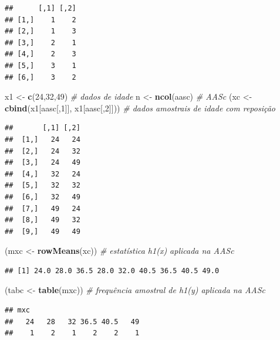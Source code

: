 \documentclass[
]{book}
\newenvironment{Shaded}{\begin{snugshade}}{\end{snugshade}}
\newcommand{\CommentTok}[1]{\textcolor[rgb]{0.56,0.35,0.01}{\textit{#1}}}
\newcommand{\DecValTok}[1]{\textcolor[rgb]{0.00,0.00,0.81}{#1}}
\newcommand{\KeywordTok}[1]{\textcolor[rgb]{0.13,0.29,0.53}{\textbf{#1}}}
\newcommand{\NormalTok}[1]{#1}
\newcommand{\StringTok}[1]{\textcolor[rgb]{0.31,0.60,0.02}{#1}}
\theoremstyle{definition}
\theoremstyle{definition}
\theoremstyle{definition}
\theoremstyle{remark}
\begin{document}
\begin{verbatim}
##      [,1] [,2]
## [1,]    1    2
## [2,]    1    3
## [3,]    2    1
## [4,]    2    3
## [5,]    3    1
## [6,]    3    2
\end{verbatim}

\begin{Shaded}
\begin{Highlighting}[]
\NormalTok{x1 \textless{}{-}}\StringTok{ }\KeywordTok{c}\NormalTok{(}\DecValTok{24}\NormalTok{,}\DecValTok{32}\NormalTok{,}\DecValTok{49}\NormalTok{)           }\CommentTok{\# dados de idade}
\NormalTok{n \textless{}{-}}\StringTok{ }\KeywordTok{ncol}\NormalTok{(aasc)}
\CommentTok{\# AASc}
\NormalTok{(xc \textless{}{-}}\StringTok{ }\KeywordTok{cbind}\NormalTok{(x1[aasc[,}\DecValTok{1}\NormalTok{]], x1[aasc[,}\DecValTok{2}\NormalTok{]])) }\CommentTok{\# dados amostrais de idade com reposição}
\end{Highlighting}
\end{Shaded}

\begin{verbatim}
##       [,1] [,2]
##  [1,]   24   24
##  [2,]   24   32
##  [3,]   24   49
##  [4,]   32   24
##  [5,]   32   32
##  [6,]   32   49
##  [7,]   49   24
##  [8,]   49   32
##  [9,]   49   49
\end{verbatim}

\begin{Shaded}
\begin{Highlighting}[]
\NormalTok{(mxc \textless{}{-}}\StringTok{ }\KeywordTok{rowMeans}\NormalTok{(xc))       }\CommentTok{\# estatística h1(x) aplicada na AASc}
\end{Highlighting}
\end{Shaded}

\begin{verbatim}
## [1] 24.0 28.0 36.5 28.0 32.0 40.5 36.5 40.5 49.0
\end{verbatim}

\begin{Shaded}
\begin{Highlighting}[]
\NormalTok{(tabc \textless{}{-}}\StringTok{ }\KeywordTok{table}\NormalTok{(mxc))        }\CommentTok{\# frequência amostral de h1(y) aplicada na AASc}
\end{Highlighting}
\end{Shaded}

\begin{verbatim}
## mxc
##   24   28   32 36.5 40.5   49 
##    1    2    1    2    2    1
\end{verbatim}
\end{document}
